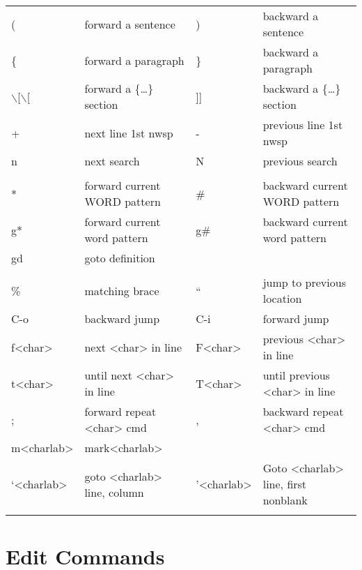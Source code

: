\documentclass[11pt]{article}
\begin{document}
\begin{center}
\begin{tabular}{llll}
( & forward a sentence & ) & backward a sentence\\
\{ & forward a paragraph & \} & backward a paragraph\\
$\backslash$[$\backslash$[ & forward a \{\ldots{}\} section & ]] & backward a \{\ldots{}\} section\\
+ & next line 1st nwsp & - & previous line 1st nwsp\\
\hline
n & next search & N & previous search\\
 &  &  & \\
* & forward current WORD pattern & \# & backward current WORD pattern\\
g* & forward current word pattern & g\# & backward current word pattern\\
gd & goto definition &  & \\
\hline
 &  &  & \\
\% & matching brace & `` & jump to previous location\\
C-o & backward jump & C-i & forward jump\\
f<char> & next <char> in line & F<char> & previous <char> in line\\
t<char> & until next <char> in line & T<char> & until previous <char> in line\\
; & forward repeat <char>  cmd & , & backward repeat <char> cmd\\
m<charlab> & mark<charlab> &  & \\
`<charlab> & goto <charlab> line, column & '<charlab> & Goto <charlab> line, first nonblank\\
 &  &  & \\
\end{tabular}
\end{center}
\section{Edit Commands}
\label{sec:org8bacbbe}
\end{document}
